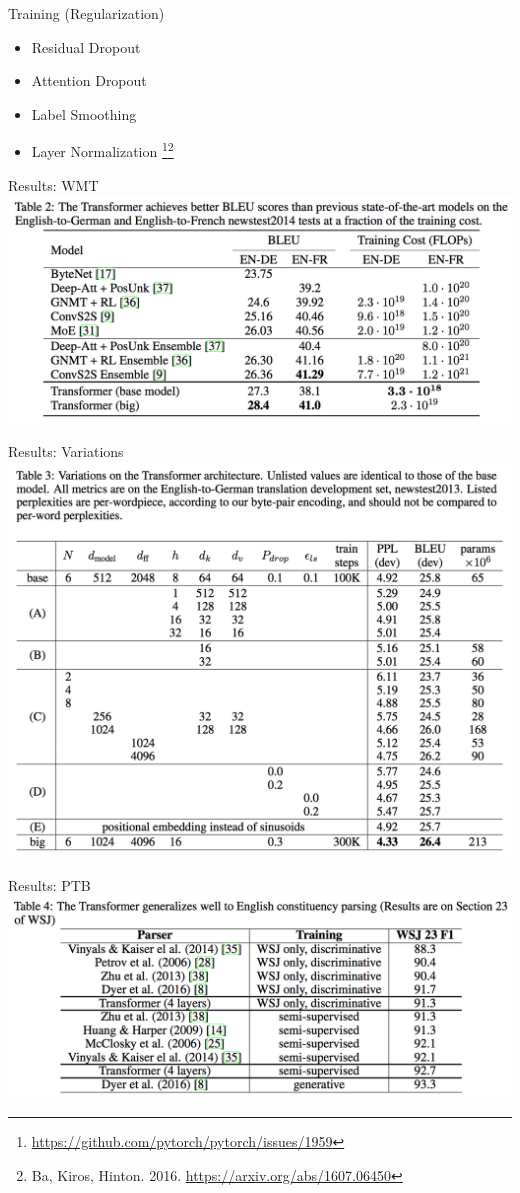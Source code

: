 \documentclass{beamer}
\begin{document}
\begin{frame}{Training (Regularization)}{}
\begin{itemize}
\item Residual Dropout
\item Attention Dropout
\item Label Smoothing
\item Layer Normalization \footnote[frame]{\url{https://github.com/pytorch/pytorch/issues/1959}}\footnote[frame]{Ba, Kiros, Hinton. 2016. \url{https://arxiv.org/abs/1607.06450}}
\end{itemize}
\end{frame}
%

\begin{frame}{Results: WMT}{}
\centering
\includegraphics[width=\linewidth]{img/wmt.png}
\end{frame}
%

\begin{frame}{Results: Variations}{}
\centering
\includegraphics[width=0.8\linewidth]{img/variations.png}
\end{frame}
%

\begin{frame}{Results: PTB}{}
\centering
\includegraphics[width=\linewidth]{img/wsj.png}
\end{frame}
%
\end{document}
